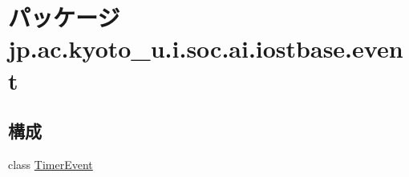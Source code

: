 \hypertarget{namespacejp_1_1ac_1_1kyoto__u_1_1i_1_1soc_1_1ai_1_1iostbase_1_1event}{\section{パッケージ jp.\-ac.\-kyoto\-\_\-u.\-i.\-soc.\-ai.\-iostbase.\-event}
\label{namespacejp_1_1ac_1_1kyoto__u_1_1i_1_1soc_1_1ai_1_1iostbase_1_1event}
}
\subsection*{構成}
\begin{DoxyCompactItemize}
\item 
class \hyperlink{classjp_1_1ac_1_1kyoto__u_1_1i_1_1soc_1_1ai_1_1iostbase_1_1event_1_1_timer_event}{Timer\-Event}
\end{DoxyCompactItemize}
